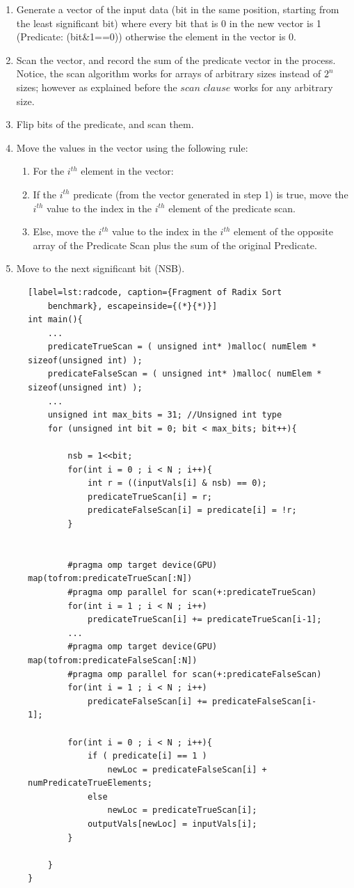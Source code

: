 \documentclass[Ingles]{ic-tese-v1}
\begin{document}
\begin{enumerate}
\item Generate a vector of the input data (bit in the same position, starting from the least significant bit)
where every bit that is 0 in the new vector is 1 (Predicate: (bit\&1==0)) otherwise the element in the vector  is 0.
\item Scan the vector, and record the sum of the predicate vector in the process. Notice, the scan
algorithm works for arrays of arbitrary sizes instead of $2^{n}$ sizes; however as
explained before the $scan$ $clause$ works  for any arbitrary size.
\item Flip bits of the predicate, and scan them.
\item Move the values in the vector using the following rule:
\begin{enumerate}
\item For the $i^{th}$ element in the vector:
\item If the $i^{th}$ predicate (from the vector generated in step 1) is true, move the $i^{th}$
value to the index in the $i^{th}$ element of the predicate scan.
\item Else, move the $i^{th}$ value to the index in the $i^{th}$ element of the opposite array
of the Predicate Scan plus the sum of the original Predicate.
\end{enumerate}
\item Move to the next significant bit (NSB).
\end{enumerate}


\begin{figure}[t]
	\lstset{basicstyle=\scriptsize}
	\begin{lstlisting}[label=lst:radcode, caption={Fragment of Radix Sort
	benchmark}, escapeinside={(*}{*)}]
int main(){
	...
	predicateTrueScan = ( unsigned int* )malloc( numElem * sizeof(unsigned int) );
	predicateFalseScan = ( unsigned int* )malloc( numElem * sizeof(unsigned int) );
	...
	unsigned int max_bits = 31; //Unsigned int type
	for (unsigned int bit = 0; bit < max_bits; bit++){

		nsb = 1<<bit;
		for(int i = 0 ; i < N ; i++){
			int r = ((inputVals[i] & nsb) == 0);
			predicateTrueScan[i] = r;
			predicateFalseScan[i] = predicate[i] = !r;
		}


		#pragma omp target device(GPU) map(tofrom:predicateTrueScan[:N])
		#pragma omp parallel for scan(+:predicateTrueScan)
		for(int i = 1 ; i < N ; i++)
			predicateTrueScan[i] += predicateTrueScan[i-1];
		...
		#pragma omp target device(GPU) map(tofrom:predicateFalseScan[:N])
		#pragma omp parallel for scan(+:predicateFalseScan)
		for(int i = 1 ; i < N ; i++)
			predicateFalseScan[i] += predicateFalseScan[i-1];

		for(int i = 0 ; i < N ; i++){
			if ( predicate[i] == 1 )
				newLoc = predicateFalseScan[i] + numPredicateTrueElements;
			else
				newLoc = predicateTrueScan[i];
			outputVals[newLoc] = inputVals[i];
		}

	}
}
	\end{lstlisting}
\end{figure}
\end{document}
